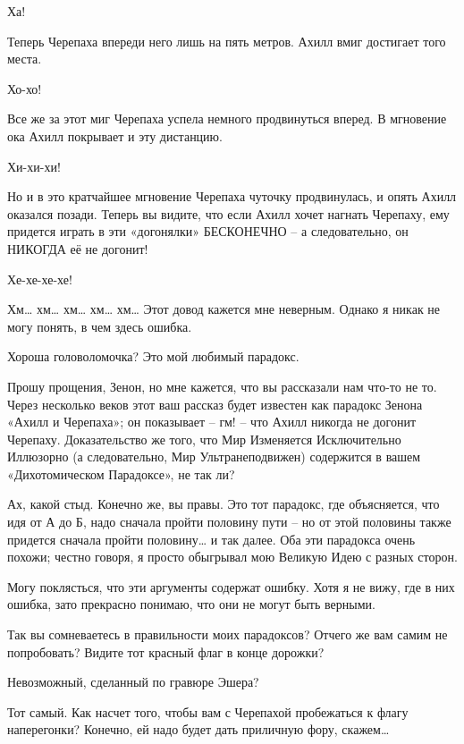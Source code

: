 \documentclass[../main.tex]{subfiles}
\begin{document}
\begin{Dialogue}
 Ха!

 Теперь Черепаха впереди него лишь на пять метров. Ахилл вмиг достигает того места.

 Хо-хо!

 Все же за этот миг Черепаха успела немного продвинуться вперед. В мгновение ока Ахилл покрывает и эту дистанцию.

 Хи-хи-хи!

 Но и в это кратчайшее мгновение Черепаха чуточку продвинулась, и опять Ахилл оказался позади. Теперь вы видите, что если Ахилл хочет нагнать Черепаху, ему придется играть в эти «догонялки» БЕСКОНЕЧНО \--- а следовательно, он НИКОГДА её не догонит!

 Хе-хе-хе-хе!

 Хм\ldots{} хм\ldots{} хм\ldots{} хм\ldots{} хм\ldots{} Этот довод кажется мне неверным. Однако я никак не могу понять, в чем здесь ошибка.

 Хороша головоломочка? Это мой любимый парадокс.

 Прошу прощения, Зенон, но мне кажется, что вы рассказали нам что-то не то. Через несколько веков этот ваш рассказ будет известен как парадокс Зенона «Ахилл и Черепаха»; он показывает \--- гм! \--- что Ахилл никогда не догонит Черепаху. Доказательство же того, что Мир Изменяется Исключительно Иллюзорно (а следовательно, Мир Ультранеподвижен) содержится в вашем «Дихотомическом Парадоксе», не так ли?

 Ах, какой стыд. Конечно же, вы правы. Это тот парадокс, где объясняется, что идя от А до Б, надо сначала пройти половину пути \--- но от этой половины также придется сначала пройти половину\ldots{} и так далее. Оба эти парадокса очень похожи; честно говоря, я просто обыгрывал мою Великую Идею с разных сторон.

 Могу поклясться, что эти аргументы содержат ошибку. Хотя я не вижу, где в них ошибка, зато прекрасно понимаю, что они не могут быть верными.

 Так вы сомневаетесь в правильности моих парадоксов? Отчего же вам самим не попробовать? Видите тот красный флаг в конце дорожки?

 Невозможный, сделанный по гравюре Эшера?

 Тот самый. Как насчет того, чтобы вам с Черепахой пробежаться к флагу наперегонки? Конечно, ей надо будет дать приличную фору, скажем\ldots{}


\end{Dialogue}
\end{document}
